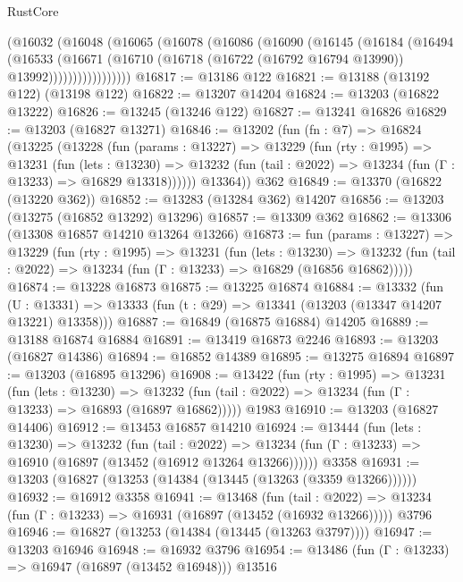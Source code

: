 \begin{lexlean}{RustCore}
\begin{coremodule}
            (@16032
              (@16048
                (@16065
                  (@16078
                    (@16086
                      (@16090
                        (@16145
                          (@16184
                            (@16494
                              (@16533
                                (@16671
                                  (@16710
                                    (@16718 (@16722 (@16792 @16794 @13990)) @13992)))))))))))))))))
@16817 := @13186 @122
@16821 := @13188 (@13192 @122) (@13198 @122)
@16822 := @13207 @14204
@16824 := @13203 (@16822 @13222)
@16826 := @13245 (@13246 @122)
@16827 := @13241 @16826
@16829 := @13203 (@16827 @13271)
@16846 := @13202
    (fun (fn : @7) =>
    @16824
      (@13225
        (@13228
          (fun (params : @13227) =>
          @13229
            (fun (rty : @1995) =>
            @13231
              (fun (lets : @13230) =>
              @13232 (fun (tail : @2022) => @13234 (fun (Γ : @13233) => @16829 @13318))))))
        @13364))
    @362
@16849 := @13370 (@16822 (@13220 @362))
@16852 := @13283 (@13284 @362) @14207
@16856 := @13203 (@13275 (@16852 @13292) @13296)
@16857 := @13309 @362
@16862 := @13306 (@13308 @16857 @14210 @13264 @13266)
@16873 := fun (params : @13227) =>
  @13229
    (fun (rty : @1995) =>
    @13231
      (fun (lets : @13230) =>
      @13232 (fun (tail : @2022) => @13234 (fun (Γ : @13233) => @16829 (@16856 @16862)))))
@16874 := @13228 @16873
@16875 := @13225 @16874
@16884 := @13332
    (fun (U : @13331) => @13333 (fun (t : @29) => @13341 (@13203 (@13347 @14207 @13221) @13358)))
@16887 := @16849 (@16875 @16884) @14205
@16889 := @13188 @16874 @16884
@16891 := @13419 @16873 @2246
@16893 := @13203 (@16827 @14386)
@16894 := @16852 @14389
@16895 := @13275 @16894
@16897 := @13203 (@16895 @13296)
@16908 := @13422
    (fun (rty : @1995) =>
    @13231
      (fun (lets : @13230) =>
      @13232 (fun (tail : @2022) => @13234 (fun (Γ : @13233) => @16893 (@16897 @16862)))))
    @1983
@16910 := @13203 (@16827 @14406)
@16912 := @13453 @16857 @14210
@16924 := @13444
    (fun (lets : @13230) =>
    @13232
      (fun (tail : @2022) =>
      @13234 (fun (Γ : @13233) => @16910 (@16897 (@13452 (@16912 @13264 @13266))))))
    @3358
@16931 := @13203 (@16827 (@13253 (@14384 (@13445 (@13263 (@3359 @13266))))))
@16932 := @16912 @3358
@16941 := @13468
    (fun (tail : @2022) => @13234 (fun (Γ : @13233) => @16931 (@16897 (@13452 (@16932 @13266)))))
    @3796
@16946 := @16827 (@13253 (@14384 (@13445 (@13263 @3797))))
@16947 := @13203 @16946
@16948 := @16932 @3796
@16954 := @13486 (fun (Γ : @13233) => @16947 (@16897 (@13452 @16948))) @13516

\end{coremodule}
\end{lexlean}
